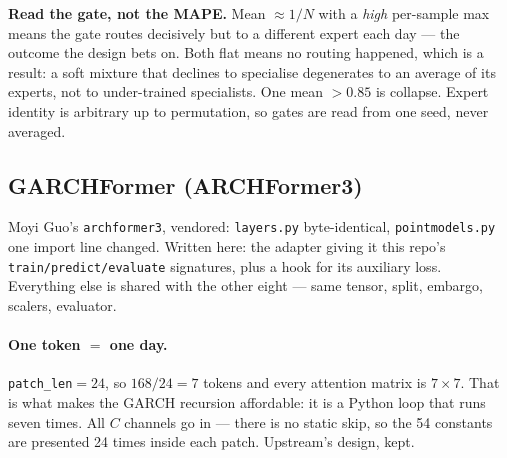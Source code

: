 \documentclass[11pt]{article}
\newcommand{\code}[1]{\texttt{\small #1}}
\begin{document}
\noindent
\textbf{Read the gate, not the MAPE.} Mean $\approx 1/N$ with a \emph{high}
per-sample max means the gate routes decisively but to a different expert each day
--- the outcome the design bets on. Both flat means no routing happened, which is a
result: a soft mixture that declines to specialise degenerates to an average of its
experts, not to under-trained specialists. One mean $>0.85$ is collapse. Expert
identity is arbitrary up to permutation, so gates are read from one seed, never
averaged.

\subsection{GARCHFormer (ARCHFormer3)}\label{sec:garchformer}

Moyi Guo's \code{archformer3}, vendored: \code{layers.py} byte-identical,
\code{pointmodels.py} one import line changed. Written here: the adapter giving it
this repo's \code{train/predict/evaluate} signatures, plus a hook for its auxiliary
loss. Everything else is shared with the other eight --- same tensor, split,
embargo, scalers, evaluator.

\paragraph{One token $=$ one day.} \code{patch\_len}$=24$, so $168/24 = 7$ tokens and
every attention matrix is $7\times7$. That is what makes the GARCH recursion
affordable: it is a Python loop that runs seven times. All $C$ channels go in ---
there is no static skip, so the 54 constants are presented 24 times inside each
patch. Upstream's design, kept.
\end{document}
